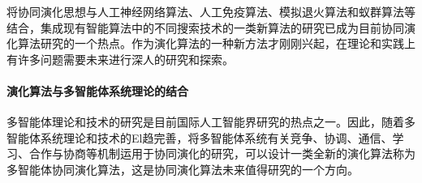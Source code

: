 \documentclass[a4paper]{article}
\begin{document}
    将协同演化思想与人工神经网络算法、人工免疫算法、模拟退火算法和蚁群算法等结合，集成现有智能算法中的不同搜索技术的一类新算法的研究已成为目前协同演化算法研究的一个热点。作为演化算法的一种新方法才刚刚兴起，在理论和实践上有许多问题需要未来进行深人的研究和探索。

    \paragraph{演化算法与多智能体系统理论的结合}
    多智能体理论和技术的研究是目前国际人工智能界研究的热点之一。因此，随着多智能体系统理论和技术的El趋完善，将多智能体系统有关竞争、协调、通信、学习、合作与协商等机制运用于协同演化的研究，可以设计一类全新的演化算法称为多智能体协同演化算法，这是协同演化算法未来值得研究的一个方向。


    \newpage
    
    
\end{document}
